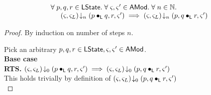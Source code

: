%
%

%
%
\begin{lemma}\label{lemma:contextSwitch}
%
\[
\begin{array}{l}
	\forall\; p, q, r \in \textsf{LState}.\; \forall\; \varsigma_{}, \varsigma_{}' \in \textsf{AMod}.\; \forall\; n \in \mathbb{N}.\;\\
	\hspace*{0.5cm} \left(\varsigma_{}, \varsigma_{L}\right) \!\downarrow_{n} \left(p \bullet_{\textsf{L}} q, r, \varsigma_{}'\right) \implies 
									\left(\varsigma_{}, \varsigma_{L}\right) \!\downarrow_{n} \left(p, q \bullet_{\textsf{L}} r, \varsigma_{}'\right)
\end{array}
\]
%
\begin{proof} By induction on number of steps $n$.

\noindent Pick an arbitrary $p, q, r \in \textsf{LState}, \varsigma_{}, \varsigma_{}' \in \textsf{AMod}$.\\

\noindent\textbf{Base case}\\
\textbf{RTS. }\hspace*{0.5cm}$\left(\varsigma_{}, \varsigma_{L}\right) \!\downarrow_{0} \left(p \bullet_{\textsf{L}} q, r, \varsigma_{}'\right) \implies \left(\varsigma_{}, \varsigma_{L}\right) \!\downarrow_{0} \left(p, q \bullet_{\textsf{L}} r, \varsigma_{}'\right)$\\
This holds trivially by definition of $\left(\varsigma_{}, \varsigma_{L}\right) \!\downarrow_{0} \left(p, q \bullet_{\textsf{L}} r, \varsigma_{}'\right)$\\


\end{proof}
\end{lemma}
